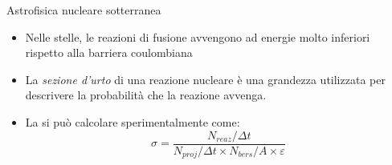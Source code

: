 \documentclass [xcolor=svgnames, 9pt] {beamer}
\begin{document}
	
	\begin{frame}{Astrofisica nucleare sotterranea}
		\begin{itemize}
			\item Nelle stelle, le reazioni di fusione avvengono ad energie molto inferiori rispetto alla barriera coulombiana
			\item La \emph{sezione d'urto} di una reazione nucleare è una grandezza utilizzata per descrivere la probabilità che la reazione avvenga.
			\item La si può calcolare sperimentalmente come:
			\begin{equation}
				\sigma = \dfrac{N_{reaz}/\Delta t}{N_{proj}/\Delta t \times N_{bers}/A \times \varepsilon}
			\end{equation}
		\end{itemize}
	\end{frame}%
	
\end{document}
